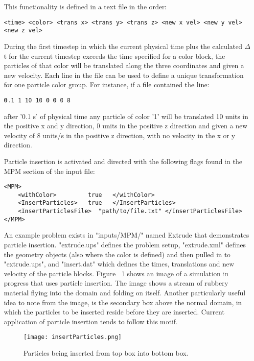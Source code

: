 This functionality is defined in a text file in the order: 

\begin{verbatim}
<time> <color> <trans x> <trans y> <trans z> <new x vel> <new y vel> <new z vel>
\end{verbatim}  

During the first timestep in which the current physical time plus the calculated 
$\Delta$t for the current timestep exceeds the time specified for a color block, the 
particles of that color will be translated along the three coordinates and given 
a new velocity.  Each line in the file can be used to define a unique transformation
for one particle color group.  For instance, if a file contained the line:

\begin{verbatim}
0.1 1 10 10 0 0 0 8 
\end{verbatim}

\noindent after '0.1 s' of physical time any particle of color '1' will be translated 10 
units in the positive x and y direction, 0 units in the positive z direction 
and given a new velocity of 8 units/s in the positive z direction, with no 
velocity in the x or y direction.

Particle insertion is activated and directed with the following flags found in the 
MPM section of the input file:
\begin{verbatim}
<MPM>
    <withColor>         true   </withColor>
    <InsertParticles>   true   </InsertParticles>
    <InsertParticlesFile>  "path/to/file.txt" </InsertParticlesFile>
</MPM>
\end{verbatim}

An example problem exists in "inputs/MPM/" named Extrude that demonstrates 
particle insertion.  "extrude.ups" defines the problem setup, "extrude.xml" defines 
the geometry objects (also where the color is defined) and then pulled in to 
"extrude.ups", and "insert.dat" which defines the times, translations and new 
velocity of the particle blocks.  Figure ~\ref{figinsertparticles} shows an image 
of a simulation in progress that uses particle insertion.  The image shows a stream 
of rubbery material flying into the domain and folding on itself.  Another particularly 
useful idea to note from the image, is the secondary box above the normal domain, in which 
the particles to be inserted reside before they are inserted.  Current application 
of particle insertion tends to follow this motif.

\begin{figure}
  \center
  \texttt{[image: insertParticles.png]}
  \caption{Particles being inserted from top box into bottom box.}
  \label{figinsertparticles}
\end{figure}


